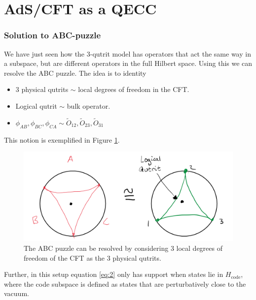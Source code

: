 \documentclass[letter,12pt]{article}
\begin{document}
\section{AdS/CFT as a QECC}
\subsubsection*{Solution to ABC-puzzle}
We have just seen how the 3-qutrit model has operators that act the same way in a subspace, but are different operators in the full Hilbert space. Using this we can resolve the ABC puzzle. The idea is to identity 
\begin{itemize}
	\item 3 physical qutrits $\sim$ local degrees of freedom in the CFT.
	\item Logical qutrit $\sim$ bulk operator.
	\item $\phi_{AB},\phi_{BC},\phi_{CA}\sim \tilde{O}_{12},\tilde{O}_{23},\tilde{O}_{31}$
\end{itemize}
This notion is exemplified in Figure \ref{fig:adscftfig5}.
\begin{figure}[H]
	\centering
	\includegraphics[width=0.85\linewidth]{ADS_CFT_Fig5}
	\caption{The ABC puzzle can be resolved by considering 3 local degrees of freedom of the CFT as the 3 physical qutrits.}
	\label{fig:adscftfig5}
\end{figure}
Further, in this setup equation \eqref{eq:2} only has support when states lie in $H_{\text{code}}$, where the code subspace is defined as states that are perturbatively close to the vacuum.
\end{document}
